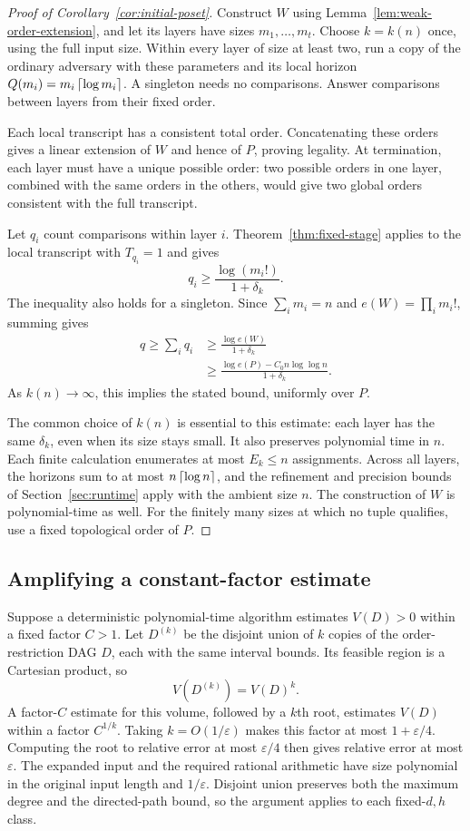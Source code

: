 \begin{proof}[Proof of Corollary~\ref{cor:initial-poset}]
Construct $W$ using Lemma~\ref{lem:weak-order-extension}, and let its
layers have sizes $m_1,\ldots,m_t$. Choose $k=k(n)$ once, using the full
input size. Within every layer of size at least two, run a copy of the
ordinary adversary with these parameters and its local horizon
$Q(m_i)=m_i\left\lceil \log m_i\right\rceil$. A singleton needs no comparisons. Answer
comparisons between layers from their fixed order.

Each local transcript has a consistent total order. Concatenating these
orders gives a linear extension of $W$ and hence of $P$, proving legality.
At termination, each layer must have a unique possible order: two possible
orders in one layer, combined with the same orders in the others, would
give two global orders consistent with the full transcript.

Let $q_i$ count comparisons within layer $i$. Theorem~\ref{thm:fixed-stage}
applies to the local transcript with $T_{q_i}=1$ and gives
\[
q_i\ge\frac{\log(m_i!)}{1+\delta_k}.
\]
The inequality also holds for a singleton. Since $\sum_i m_i=n$ and
$e(W)=\prod_i m_i!$, summing gives
\begin{align*}
q\ge\sum_i q_i
&\ge\frac{\log e(W)}{1+\delta_k}\\
&\ge\frac{\log e(P)-C_0 n\log\log n}{1+\delta_k}.
\end{align*}
As $k(n)\to\infty$, this implies the stated bound, uniformly over $P$.

The common choice of $k(n)$ is essential to this estimate: each layer
has the same $\delta_k$, even when its size stays small.
It also preserves polynomial time in $n$. Each finite calculation
enumerates at most $E_k\le n$ assignments. Across all layers, the horizons
sum to at most $n\left\lceil \log n\right\rceil$, and the refinement and precision bounds
of Section~\ref{sec:runtime} apply with the ambient size $n$.
The construction of $W$ is polynomial-time as well. For the finitely
many sizes at which no tuple qualifies, use a fixed topological order of
$P$.
\end{proof}

\subsection{Amplifying a constant-factor estimate}
\label{app:counting-amplification}

Suppose a deterministic polynomial-time algorithm estimates $V(D)>0$
within a fixed factor $C>1$. Let $D^{(k)}$ be the disjoint union of $k$
copies of the order-restriction DAG $D$, each with the same interval
bounds. Its feasible region is a Cartesian product, so
\[
V(D^{(k)})=V(D)^k.
\]
A factor-$C$ estimate for this volume, followed by a $k$th root, estimates
$V(D)$ within a factor $C^{1/k}$. Taking $k=O(1/\varepsilon)$ makes this
factor at most $1+\varepsilon/4$. Computing the root to relative error at
most $\varepsilon/4$ then gives relative error at most $\varepsilon$.
The expanded input and the required rational arithmetic have size
polynomial in the original input length and $1/\varepsilon$.
Disjoint union preserves both the maximum degree and the directed-path
bound, so the argument applies to each fixed-$d,h$ class.

